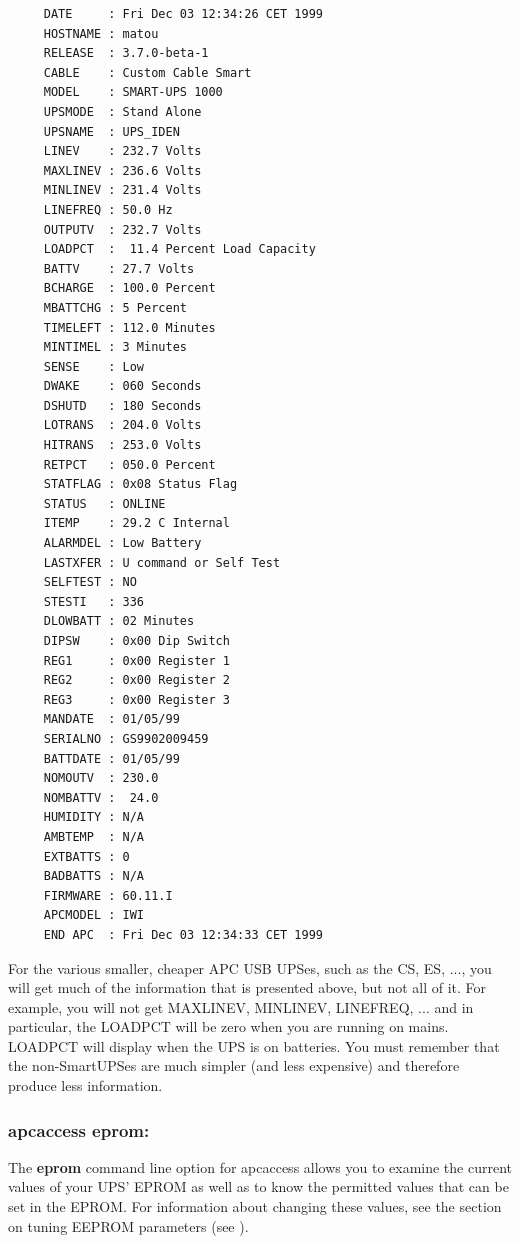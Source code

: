 {{\footnotesize
\begin{verbatim}
     DATE     : Fri Dec 03 12:34:26 CET 1999
     HOSTNAME : matou
     RELEASE  : 3.7.0-beta-1
     CABLE    : Custom Cable Smart
     MODEL    : SMART-UPS 1000
     UPSMODE  : Stand Alone
     UPSNAME  : UPS_IDEN
     LINEV    : 232.7 Volts
     MAXLINEV : 236.6 Volts
     MINLINEV : 231.4 Volts
     LINEFREQ : 50.0 Hz
     OUTPUTV  : 232.7 Volts
     LOADPCT  :  11.4 Percent Load Capacity
     BATTV    : 27.7 Volts
     BCHARGE  : 100.0 Percent
     MBATTCHG : 5 Percent
     TIMELEFT : 112.0 Minutes
     MINTIMEL : 3 Minutes
     SENSE    : Low
     DWAKE    : 060 Seconds
     DSHUTD   : 180 Seconds
     LOTRANS  : 204.0 Volts
     HITRANS  : 253.0 Volts
     RETPCT   : 050.0 Percent
     STATFLAG : 0x08 Status Flag
     STATUS   : ONLINE
     ITEMP    : 29.2 C Internal
     ALARMDEL : Low Battery
     LASTXFER : U command or Self Test
     SELFTEST : NO
     STESTI   : 336
     DLOWBATT : 02 Minutes
     DIPSW    : 0x00 Dip Switch
     REG1     : 0x00 Register 1
     REG2     : 0x00 Register 2
     REG3     : 0x00 Register 3
     MANDATE  : 01/05/99
     SERIALNO : GS9902009459
     BATTDATE : 01/05/99
     NOMOUTV  : 230.0
     NOMBATTV :  24.0
     HUMIDITY : N/A
     AMBTEMP  : N/A
     EXTBATTS : 0
     BADBATTS : N/A
     FIRMWARE : 60.11.I
     APCMODEL : IWI
     END APC  : Fri Dec 03 12:34:33 CET 1999
\end{verbatim}
\normalsize

For the various smaller, cheaper APC USB UPSes, such as the CS, ES, ..., you
will get much of the information that is presented above, but not all of it.
For example, you will not get MAXLINEV, MINLINEV, LINEFREQ, ... and in
particular, the LOADPCT will be zero when you are running on mains. LOADPCT
will display when the UPS is on batteries.  You must remember that the
non-SmartUPSes are much simpler (and less expensive) and therefore produce
less information. 

\label{apcaccess-eprom}

\subsubsection*{apcaccess eprom:}

\label{index-apcaccess-eeprom-114}
\label{index-eeprom_002c-apcaccess-115}
The {\bf eprom} command line option for apcaccess allows you to examine the
current values of your UPS' EPROM as well as to know the permitted values that
can be set in the EPROM. For information about changing these values, see the
section on tuning EEPROM parameters (see 
).  

}}
